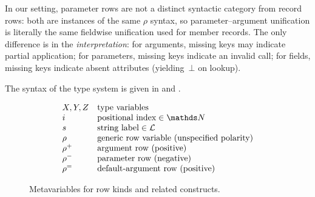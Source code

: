 \noindent
In our setting, parameter rows are not a distinct syntactic category from record rows: both are instances of the same $\rho$ syntax, so parameter–argument unification is literally the same fieldwise unification used for member records.  
The only difference is in the \emph{interpretation}:
for arguments, missing keys may indicate partial application;
for parameters, missing keys indicate an invalid call;
for fields, missing keys indicate absent attributes (yielding~$\bot$ on lookup).

The syntax of the type system is given in  and .

\begin{figure}[t]
\centering
\[
\begin{array}{ll}
X, Y, Z & \text{type variables} \\
i & \text{positional index} \in \tN \\
s & \text{string label} \in \mathcal{L} \\
\rho & \text{generic row variable (unspecified polarity)} \\
\rpos & \text{argument row (positive)} \\
\rneg & \text{parameter row (negative)} \\
\rdef & \text{default-argument row (positive)}
\end{array}
\]
\caption{Metavariables for row kinds and related constructs.}
\label{fig:metavars}
\end{figure}

